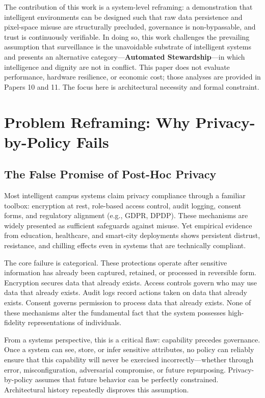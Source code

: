\documentclass[conference]{IEEEtran}
\begin{document}
The contribution of this work is a system-level reframing: a demonstration that intelligent environments can be designed such that raw data persistence and pixel-space misuse are structurally precluded, governance is non-bypassable, and trust is continuously verifiable. In doing so, this work challenges the prevailing assumption that surveillance is the unavoidable substrate of intelligent systems and presents an alternative category---\textbf{Automated Stewardship}---in which intelligence and dignity are not in conflict. This paper does not evaluate performance, hardware resilience, or economic cost; those analyses are provided in Papers 10 and 11. The focus here is architectural necessity and formal constraint.

\section{Problem Reframing: Why Privacy-by-Policy Fails}

\subsection{The False Promise of Post-Hoc Privacy}
Most intelligent campus systems claim privacy compliance through a familiar toolbox: encryption at rest, role-based access control, audit logging, consent forms, and regulatory alignment (e.g., GDPR, DPDP). These mechanisms are widely presented as sufficient safeguards against misuse. Yet empirical evidence from education, healthcare, and smart-city deployments shows persistent distrust, resistance, and chilling effects even in systems that are technically compliant.

The core failure is categorical. These protections operate after sensitive information has already been captured, retained, or processed in reversible form. Encryption secures data that already exists. Access controls govern who may use data that already exists. Audit logs record actions taken on data that already exists. Consent governs permission to process data that already exists. None of these mechanisms alter the fundamental fact that the system possesses high-fidelity representations of individuals.

From a systems perspective, this is a critical flaw: capability precedes governance. Once a system can see, store, or infer sensitive attributes, no policy can reliably ensure that this capability will never be exercised incorrectly---whether through error, misconfiguration, adversarial compromise, or future repurposing. Privacy-by-policy assumes that future behavior can be perfectly constrained. Architectural history repeatedly disproves this assumption.
\end{document}
